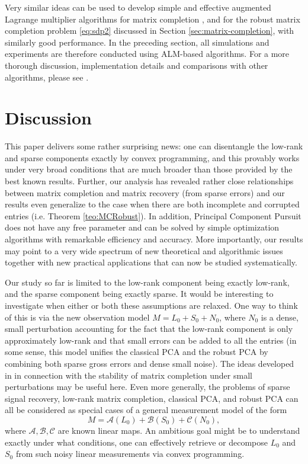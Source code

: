 Very similar ideas can be used to develop simple and effective augmented Lagrange multiplier algorithms for matrix completion \cite{Lin2009-ALM}, and for the robust matrix completion problem
\eqref{eq:sdp2} discussed in Section \ref{sec:matrix-completion}, with similarly good performance. In the preceding section, all simulations and experiments are therefore conducted using ALM-based algorithms. For a more thorough discussion, implementation details and comparisons with other algorithms, please see \cite{Lin2009-ALM,Yuan2009}.

\section{Discussion}
\label{sec:discussion}

This paper delivers some rather surprising news: one can disentangle the low-rank and sparse components exactly by convex programming, and this provably works under very broad conditions that are much broader than those provided by the best known results.  Further, our analysis has revealed rather close relationships between matrix completion and matrix recovery (from sparse errors) and our results even generalize to the case when there are both incomplete and corrupted entries (i.e. Theorem \ref{teo:MCRobust}).  In addition, Principal Component Pursuit\, does not have any free parameter and can be solved by simple optimization algorithms with remarkable efficiency and accuracy. More importantly, our results may point to a very wide spectrum of new theoretical and algorithmic issues together with new practical applications that can now be studied systematically.

Our study so far is limited to the low-rank component being exactly low-rank, and the sparse component being exactly sparse. It would be interesting to investigate when either or both these assumptions are relaxed. One way to think of this is via the new observation model $M = L_0 + S_0 + N_0$, where $N_0$ is a dense, small perturbation accounting for the fact that the low-rank component is only approximately low-rank and that small errors can be added to all the entries (in some sense, this model unifies the classical PCA and the robust PCA by combining both sparse gross errors and dense small noise). The ideas developed in \cite{Candes2009-PIEEE} in connection with the stability of matrix completion under small perturbations may be useful here. Even more generally, the problems of sparse signal recovery, low-rank matrix completion, classical PCA, and robust PCA can all be considered as special cases of a general measurement model of the form
\[
M = \mathcal{A}(L_0) + \mathcal{B}(S_0) + \mathcal{C}(N_0),
\]
where $ \mathcal{A}, \mathcal{B}, \mathcal{C}$ are known linear maps. An ambitious goal might be to understand exactly under what conditions, one can effectively retrieve or decompose $L_0$ and $S_0$ from such noisy linear measurements via convex programming.

